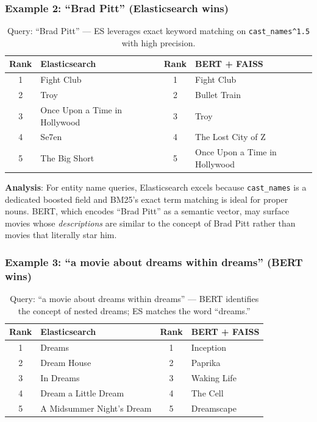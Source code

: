 \documentclass[11pt,a4paper]{article}
\begin{document}
\subsubsection{Example 2: ``Brad Pitt'' (Elasticsearch wins)}

\begin{table}[H]
\centering
\small
\begin{tabular}{@{}clcl@{}}
\toprule
\textbf{Rank} & \textbf{Elasticsearch} & \textbf{Rank} & \textbf{BERT + FAISS} \\
\midrule
1 & Fight Club & 1 & Fight Club \\
2 & Troy & 2 & Bullet Train \\
3 & Once Upon a Time in Hollywood & 3 & Troy \\
4 & Se7en & 4 & The Lost City of Z \\
5 & The Big Short & 5 & Once Upon a Time in Hollywood \\
\bottomrule
\end{tabular}
\caption{Query: ``Brad Pitt'' --- ES leverages exact keyword matching on \texttt{cast\_names\^{}1.5} with high precision.}
\label{tab:compare2}
\end{table}

\noindent \textbf{Analysis}: For entity name queries, Elasticsearch excels because \texttt{cast\_names} is a dedicated boosted field and BM25's exact term matching is ideal for proper nouns. BERT, which encodes ``Brad Pitt'' as a semantic vector, may surface movies whose \textit{descriptions} are similar to the concept of Brad Pitt rather than movies that literally star him.

\subsubsection{Example 3: ``a movie about dreams within dreams'' (BERT wins)}

\begin{table}[H]
\centering
\small
\begin{tabular}{@{}clcl@{}}
\toprule
\textbf{Rank} & \textbf{Elasticsearch} & \textbf{Rank} & \textbf{BERT + FAISS} \\
\midrule
1 & Dreams & 1 & Inception \\
2 & Dream House & 2 & Paprika \\
3 & In Dreams & 3 & Waking Life \\
4 & Dream a Little Dream & 4 & The Cell \\
5 & A Midsummer Night's Dream & 5 & Dreamscape \\
\bottomrule
\end{tabular}
\caption{Query: ``a movie about dreams within dreams'' --- BERT identifies the concept of nested dreams; ES matches the word ``dreams.''}
\label{tab:compare3}
\end{table}
\end{document}
